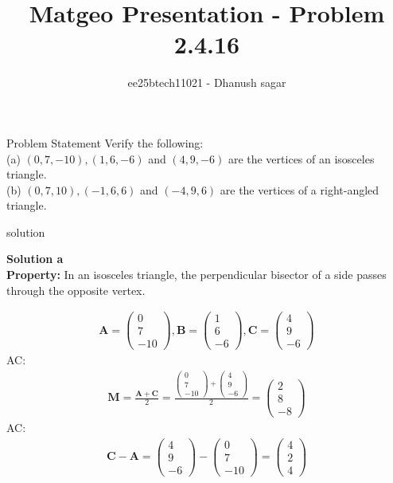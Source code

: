 \documentclass{beamer}
\title{Matgeo Presentation - Problem 2.4.16}
\author{ee25btech11021 - Dhanush sagar}
\numberwithin{equation}{section}
\theoremstyle{remark}
\newcommand{\myvec}[1]{\ensuremath{\begin{pmatrix}#1\end{pmatrix}}}
\let\vec\mathbf
\begin{document}
	

		




\begin{frame}
  \titlepage
\end{frame}

\begin{frame}{Problem Statement}
 Verify the following:\\  
(a) $(0,7,-10), (1,6,-6)$ and $(4,9,-6)$ are the vertices of an isosceles triangle.  \\
(b) $(0,7,10), (-1,6,6)$ and $(-4,9,6)$ are the vertices of a right-angled triangle.
\end{frame}

\begin{frame}{solution}
 

\textbf{Solution a}\\
\textbf{Property:} In an isosceles triangle, the perpendicular bisector of a side passes through the opposite vertex.

\begin{align}
\vec{A} = \myvec{0\\7\\-10},  
\vec{B} = \myvec{1\\6\\-6},  
\vec{C} = \myvec{4\\9\\-6}
\end{align}
 AC: 
\begin{align}
 \vec{M} = \frac{\vec{A}+\vec{C}}{2} 
= \frac{\myvec{0\\7\\-10}+\myvec{4\\9\\-6}}{2} 
= \myvec{2\\8\\-8}
\end{align}
 AC: 
\begin{align}
 \vec{C}-\vec{A} = \myvec{4\\9\\-6}-\myvec{0\\7\\-10} 
= \myvec{4\\2\\4}
\end{align}
\end{frame}
\end{document}
